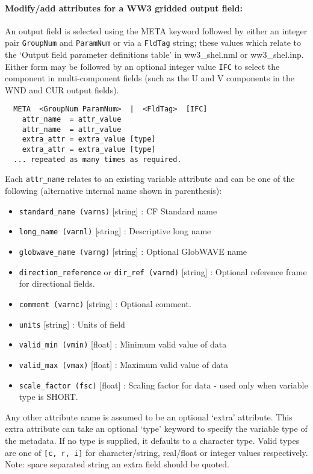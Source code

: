 \noindent
\paragraph{Modify/add attributes for a WW3 gridded output field:}

\noindent
An output field is selected using the META keyword followed by
either an integer pair \texttt{GroupNum} and \texttt{ParamNum}
or via a \texttt{FldTag} string; these values which relate to the
`Output field parameter definitions table' in ww3\_shel.nml
or ww3\_shel.inp.
Either form may be followed by an optional integer value \texttt{IFC}
to select the component in multi-component fields (such as the U and
V components in the WND and CUR output fields).

\begin{verbatim}
  META  <GroupNum ParamNum>  |  <FldTag>  [IFC]
    attr_name  = attr_value
    attr_name  = attr_value
    extra_attr = extra_value [type]
    extra_attr = extra_value [type]
  ... repeated as many times as required.
\end{verbatim}


\noindent
Each \texttt{attr\_name} relates to an existing variable attribute and
can be one of the following (alternative internal name shown in parenthesis):
\begin{itemize}
 \item  \texttt{standard\_name (varns)} [string] : CF Standard name
 \item  \texttt{long\_name (varnl)} [string] : Descriptive long name
 \item  \texttt{globwave\_name (varng)} [string] : Optional GlobWAVE name
 \item  \texttt{direction\_reference} or \texttt{dir\_ref (varnd)} [string] : Optional reference
 frame for directional fields.
 \item  \texttt{comment (varnc)} [string] : Optional comment.
 \item  \texttt{units} [string] : Units of field
 \item  \texttt{valid\_min (vmin)} [float] : Minimum valid value of data
 \item  \texttt{valid\_max (vmax)} [float] : Maximum valid value of data
 \item  \texttt{scale\_factor (fsc)} [float] : Scaling factor for data - used only when
 variable type is SHORT.
\end{itemize}

\noindent
Any other attribute name is assumed to be an optional `extra'
attribute. This extra attribute can take an optional `type'
keyword to specify the variable type of the metadata. If
no type is supplied, it defaults to a character type. Valid
types are one of \texttt{[c, r, i]} for character/string,
real/float or integer values respectively. Note: space
separated string an extra field should be quoted.

